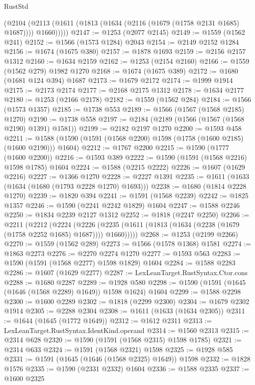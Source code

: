 \begin{lexlean}{RustStd}
\begin{coremodule}
        (@2104 (@2113 (@1611 (@1813 (@1634 (@2116 (@1679 (@1758 @2131 @1685) @1687)))) @1660)))))
@2147 := @1253 (@2077 @2145)
@2149 := @1559 (@1562 @241)
@2152 := @1566 (@1573 @1284) @2043
@2154 := @2149 @2152 @1284
@2156 := @1674 (@1675 @380)
@2157 := @1878 @1693
@2159 := @2156 @2157 @1312
@2160 := @1634 @2159
@2162 := @1253 (@2154 @2160)
@2166 := @1559 (@1562 @279) @1982 @1270
@2168 := @1674 (@1675 @389)
@2172 := @1680 (@1681 @124 @394) @1687
@2173 := @1679 @2172
@2174 := @1999 @1914
@2175 := @2173 @2174
@2177 := @2168 @2175 @1312
@2178 := @1634 @2177
@2180 := @1253 (@2166 @2178)
@2182 := @1559 (@1562 @284)
@2184 := @1566 (@1573 @1357)
@2185 := @1738 @553
@2189 := @1566 (@1567 (@1568 @2185) @1270)
@2190 := @1738 @558
@2197 := @2184 (@2189 (@1566 (@1567 (@1568 @2190) @1391) @1581))
@2199 := @2182 @2197 @1270
@2200 := @1593 @458
@2211 := @1588 (@1590 (@1591 (@1568 @2200) @1598 (@1758 (@1600 @2185) (@1600 @2190))) @1604)
@2212 := @1767 @2200
@2215 := @1590 (@1777 (@1600 @2200))
@2216 := @1593 @389
@2222 := @1590 (@1591 (@1568 @2216) @1598 @1785) @1604
@2224 := @1588 (@2215 @2222)
@2226 := @1607 (@1629 @2216)
@2227 := @1366 @1270
@2228 := @2227 @1391
@2235 := @1611 (@1633 (@1634 (@1680 (@1793 @2228 @1270) @1693)))
@2238 := @1680 (@1814 @2228 @1270)
@2239 := @1820 @394
@2241 := @1591 (@1568 @2239)
@2242 := @1825 @1357
@2246 := @1590 (@2241 @2242 @1829) @1604
@2247 := @1588 @2246
@2250 := @1834 @2239 @2127 @1312
@2252 := @1818 (@2247 @2250)
@2266 := @2211
    (@2212
      (@2224
        (@2226 (@2235 (@1611 (@1813 (@1634 (@2238 (@1679 (@1758 @2252 @1685) @1687)))) @1660)))))
@2268 := @1253 (@2199 @2266)
@2270 := @1559 (@1562 @289)
@2273 := @1566 (@1578 @1368) @1581
@2274 := @1863 @2273
@2276 := @2270 @2274 @1270
@2277 := @1593 @563
@2283 := @1590 (@1591 (@1568 @2277) @1598 @1829) @1604
@2284 := @1588 @2283
@2286 := @1607 (@1629 @2277)
@2287 := LexLeanTarget.RustSyntax.Ctor.cons
@2288 := @1680 @2287
@2289 := @1928 @580
@2298 := @1590 (@1591 (@1645 (@1646 (@1568 @2289) @1649)) @1598 @1624) @1604
@2299 := @1588 @2298
@2300 := @1600 @2289
@2302 := @1818 (@2299 @2300)
@2304 := @1679 @2302 @1914
@2305 := @2288 @2304
@2308 := @1611 (@1633 (@1634 @2305))
@2311 := @1644 (@1645 (@1772 @1649))
@2312 := @1612 @2311
@2313 := LexLeanTarget.RustSyntax.IdentKind.operand
@2314 := @1560 @2313
@2315 := @2314 @628
@2320 := @1590 (@1591 (@1568 @2315) @1598 @1785)
@2321 := @2314 @633
@2324 := @1591 (@1568 @2321) @1598
@2325 := @1928 @585
@2331 := @1591 (@1645 (@1646 (@1568 @2325) @1649)) @1598
@2332 := @1828 @1576
@2335 := @1590 (@2331 @2332) @1604
@2336 := @1588 @2335
@2337 := @1600 @2325

\end{coremodule}
\end{lexlean}
